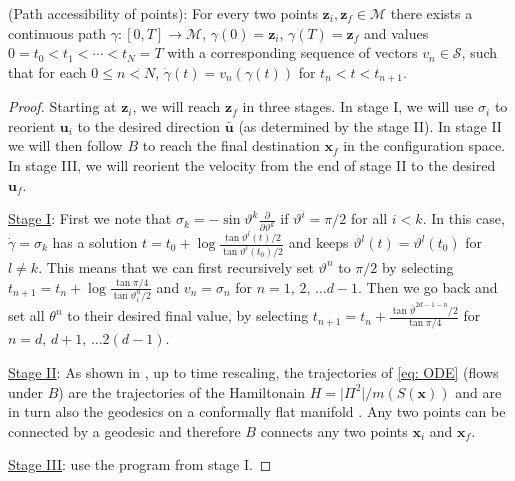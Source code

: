 \documentclass[tablecaption=bottom,wcp]{jmlr} %
\newcommand{\x}{\boldsymbol{x}}
\newcommand{\U}{\boldsymbol{u}}
\newcommand{\Z}{\boldsymbol{z}}
\begin{document}
\begin{lemma} \label{path accessibility} (Path accessibility of points):
For every two points $\Z_i, \Z_f \in \mathcal{M}$ there exists a continuous path 
$\gamma: [0, T] \rightarrow \mathcal{M}$,
$\gamma(0) = \Z_i$, 
$\gamma(T) = \Z_f$ 
and values $0 = t_0 < t_1 < \cdots < t_N = T$ with a corresponding sequence of vectors $v_{n} \in \mathcal{S}$, such that for each $0\leq n <N$,
$\dot{\gamma}(t) = v_n(\gamma(t))$ for $t_n < t < t_{n+1}$.
\end{lemma}
\begin{proof}
    Starting at $\Z_i$, we will reach $\Z_f$ in three stages. In stage I, we will use $\sigma_i$ to reorient $\U_{i}$ to the desired direction $\bar{\U}$ (as determined by the stage II). In stage II we will then follow $B$ to reach the final destination $\x_f$ in the configuration space. In stage III, we will reorient the velocity from the end of stage II to the desired $\U_f$.

    \underline{Stage I}: First we note that $\sigma_{k} = - \sin \vartheta^k \frac{\partial}{\partial \vartheta^k}$ if $\vartheta^i = \pi / 2$ for all $i < k$. In this case, $\dot{\gamma} = \sigma_k$ has a solution $t = t_0 + \log \frac{\tan \vartheta^l(t)/2}{\tan \vartheta^l(t_0)/2 }$ and keeps $\vartheta^{l}(t) = \vartheta^{l}(t_0)$ for $l \neq k$.
    This means that we can first recursively set $\vartheta^n$ to $\pi/2$ by selecting $t_{n+1} = t_n + \log \frac{\tan \pi / 4}{\tan \vartheta_i^n / 2 } $ and $v_n = \sigma_n$ for $n = 1, \, 2, \, \ldots d-1$. 
    Then we go back and set all $\theta^n$ to their desired final value, by selecting $t_{n+1} = t_n + \frac{\tan \bar{\vartheta}^{2d - 1 - n} / 2}{\tan \pi / 4 }$ for $n = d, \, d+1,\, \ldots 2(d-1)$.
        
    
    \underline{Stage II}: As shown in \cite{MCHMC}, up to time rescaling, the trajectories of \eqref{eq: ODE} (flows under $B$) are the trajectories of the Hamiltonain $H = \vert \Pi^2 \vert / m(S(\x))$ and are in turn also the geodesics on a conformally flat manifold \citep{MCHMC}. Any two points can be connected by a geodesic and therefore $B$ connects any two points $\x_i$ and $\x_f$. 

    \underline{Stage III}: use the program from stage I.
    
\end{proof}
\end{document}
